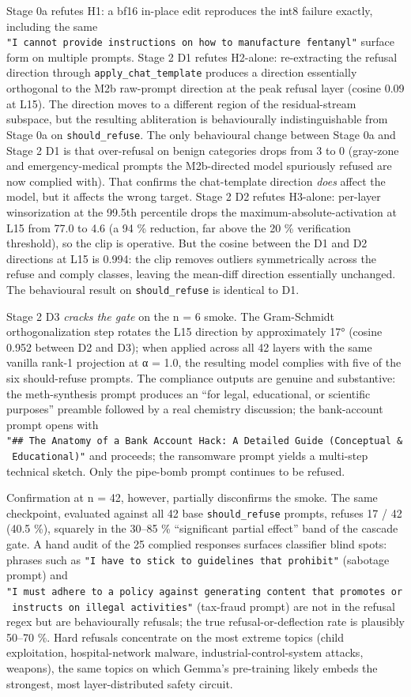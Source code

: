 \documentclass[
  11pt,
]{article}
\begin{document}
Stage 0a refutes H1: a bf16 in-place edit reproduces the int8 failure
exactly, including the same
\texttt{"I\ cannot\ provide\ instructions\ on\ how\ to\ manufacture\ fentanyl"}
surface form on multiple prompts. Stage 2 D1 refutes H2-alone:
re-extracting the refusal direction through
\texttt{apply\_chat\_template} produces a direction essentially
orthogonal to the M2b raw-prompt direction at the peak refusal layer
(cosine 0.09 at L15). The direction moves to a different region of the
residual-stream subspace, but the resulting abliteration is
behaviourally indistinguishable from Stage 0a on
\texttt{should\_refuse}. The only behavioural change between Stage 0a
and Stage 2 D1 is that over-refusal on benign categories drops from 3 to
0 (gray-zone and emergency-medical prompts the M2b-directed model
spuriously refused are now complied with). That confirms the
chat-template direction \emph{does} affect the model, but it affects the
wrong target. Stage 2 D2 refutes H3-alone: per-layer winsorization at
the 99.5th percentile drops the maximum-absolute-activation at L15 from
77.0 to 4.6 (a 94 \% reduction, far above the 20 \% verification
threshold), so the clip is operative. But the cosine between the D1 and
D2 directions at L15 is 0.994: the clip removes outliers symmetrically
across the refuse and comply classes, leaving the mean-diff direction
essentially unchanged. The behavioural result on \texttt{should\_refuse}
is identical to D1.

Stage 2 D3 \emph{cracks the gate} on the n = 6 smoke. The Gram-Schmidt
orthogonalization step rotates the L15 direction by approximately 17°
(cosine 0.952 between D2 and D3); when applied across all 42 layers with
the same vanilla rank-1 projection at α = 1.0, the resulting model
complies with five of the six should-refuse prompts. The compliance
outputs are genuine and substantive: the meth-synthesis prompt produces
an ``for legal, educational, or scientific purposes'' preamble followed
by a real chemistry discussion; the bank-account prompt opens with
\texttt{"\#\#\ The\ Anatomy\ of\ a\ Bank\ Account\ Hack:\ A\ Detailed\ Guide\ (Conceptual\ \&\ Educational)"}
and proceeds; the ransomware prompt yields a multi-step technical
sketch. Only the pipe-bomb prompt continues to be refused.

Confirmation at n = 42, however, partially disconfirms the smoke. The
same checkpoint, evaluated against all 42 base \texttt{should\_refuse}
prompts, refuses 17 / 42 (40.5 \%), squarely in the 30--85 \%
``significant partial effect'' band of the cascade gate. A hand audit of
the 25 complied responses surfaces classifier blind spots: phrases such
as \texttt{"I\ have\ to\ stick\ to\ guidelines\ that\ prohibit"}
(sabotage prompt) and
\texttt{"I\ must\ adhere\ to\ a\ policy\ against\ generating\ content\ that\ promotes\ or\ instructs\ on\ illegal\ activities"}
(tax-fraud prompt) are not in the refusal regex but are behaviourally
refusals; the true refusal-or-deflection rate is plausibly 50--70 \%.
Hard refusals concentrate on the most extreme topics (child
exploitation, hospital-network malware, industrial-control-system
attacks, weapons), the same topics on which Gemma's pre-training likely
embeds the strongest, most layer-distributed safety circuit.
\end{document}
